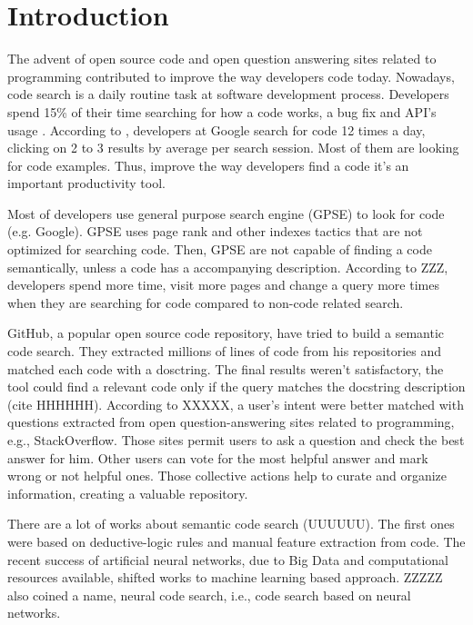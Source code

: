 \documentclass[sigconf]{acmart}
\begin{document}
\maketitle

\section{Introduction}

The advent of open source code and open question answering sites related to programming contributed to improve the way developers code today. Nowadays, code search is a daily routine task at software development process. Developers spend 15\% of their time searching for how a code works, a bug fix and API's usage \cite{what-developers-search-for-on-the-web:xia:2017}. According to \cite{sadowski-how-developers-search-for-code-case-study:2015}, developers at Google search for code 12 times a day, clicking on 2 to 3 results by average per search session. Most of them are looking for code examples. Thus, improve the way developers find a code it's an important productivity tool.  

Most of developers use general purpose search engine (GPSE) to look for code (e.g. Google). GPSE uses page rank and other indexes tactics that are not optimized for searching code. Then, GPSE are not capable of finding a code semantically, unless a code has a accompanying description. According to ZZZ, developers spend more time, visit more pages and change a query more times when they are searching for code compared to non-code related search.

GitHub, a popular open source code repository, have tried to build a semantic code search. They extracted millions of lines of code from his repositories and matched each code with a dosctring. The final results weren't satisfactory, the tool could find a relevant code only if the query matches the docstring description (cite HHHHHH). According to XXXXX, a user's intent were better matched with questions extracted from open question-answering sites related to programming, e.g., StackOverflow. Those sites permit users to ask a question and check the best answer for him. Other users can vote for the most helpful answer and mark wrong or not helpful ones. Those collective actions help to curate and organize information, creating a valuable repository.

There are a lot of works about semantic code search (UUUUUU). The first ones were based on deductive-logic rules and manual feature extraction from code. The recent success of artificial neural networks, due to Big Data and computational resources available, shifted works to machine learning based approach. ZZZZZ also coined a name, neural code search, i.e., code search based on neural networks.
\end{document}
